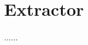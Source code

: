 \documentclass[lnbip]{svmultln}
\begin{document}
\section{Extractor}
......








%


\end{document}
